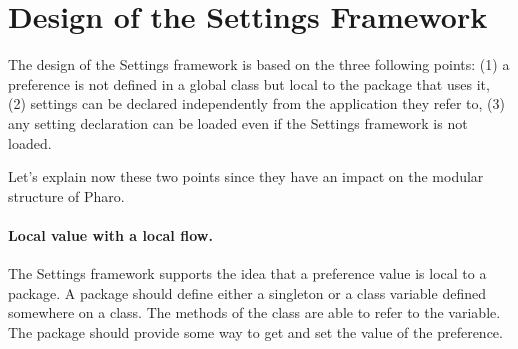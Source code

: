 \documentclass[a4paper,10pt,twoside]{book}
\begin{document}
%

%
%
%
%

\section{Design of the Settings Framework}
The design of the Settings framework is based on the three following points: (1) a preference is not defined in a global class but local to the package that uses it, (2) settings can be declared independently from the application they refer to, (3) any setting declaration can be loaded even if the Settings framework is not loaded. 

Let's explain now these two points since they have an impact on the modular structure of Pharo. 


\paragraph{Local value with a local flow.}
The Settings framework supports the idea that a preference value is local to a package. A package should define either a singleton or a class variable defined somewhere on a class. The methods of the class are able to refer to the variable. The package should provide some way to get and set the value of the preference.
\end{document}
